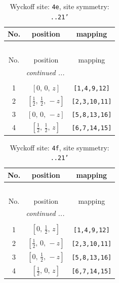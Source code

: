 \documentclass[fleqn,8pt]{jsarticle}
\begin{document}
\begin{longtable}{ccc}
\caption{Wyckoff site: {\tt 4e}, site symmetry: {\tt ..21'}}
 \\
 \hline \hline
No. & position & mapping \\ \hline \endfirsthead

\multicolumn{2}{l}{\tablename\ \thetable{}} \\
 \hline \hline
No. & position & mapping \\ \hline \endhead

 \hline \hline
\multicolumn{2}{r}{\footnotesize\it continued ...} \\ \endfoot

 \hline \hline
\multicolumn{2}{r}{} \\ \endlastfoot

1 & $\left[ 0,\, 0,\, z \right]$ & {\tt [1,4,9,12]} \\ \hline
2 & $\left[ \frac{1}{2},\, \frac{1}{2},\, - z \right]$ & {\tt [2,3,10,11]} \\ \hline
3 & $\left[ 0,\, 0,\, - z \right]$ & {\tt [5,8,13,16]} \\ \hline
4 & $\left[ \frac{1}{2},\, \frac{1}{2},\, z \right]$ & {\tt [6,7,14,15]} \\
\end{longtable}
\renewcommand{\arraystretch}{1.2}
\begin{longtable}{ccc}
\caption{Wyckoff site: {\tt 4f}, site symmetry: {\tt ..21'}}
 \\
 \hline \hline
No. & position & mapping \\ \hline \endfirsthead

\multicolumn{2}{l}{\tablename\ \thetable{}} \\
 \hline \hline
No. & position & mapping \\ \hline \endhead

 \hline \hline
\multicolumn{2}{r}{\footnotesize\it continued ...} \\ \endfoot

 \hline \hline
\multicolumn{2}{r}{} \\ \endlastfoot

1 & $\left[ 0,\, \frac{1}{2},\, z \right]$ & {\tt [1,4,9,12]} \\ \hline
2 & $\left[ \frac{1}{2},\, 0,\, - z \right]$ & {\tt [2,3,10,11]} \\ \hline
3 & $\left[ 0,\, \frac{1}{2},\, - z \right]$ & {\tt [5,8,13,16]} \\ \hline
4 & $\left[ \frac{1}{2},\, 0,\, z \right]$ & {\tt [6,7,14,15]} \\
\end{longtable}
\end{document}
